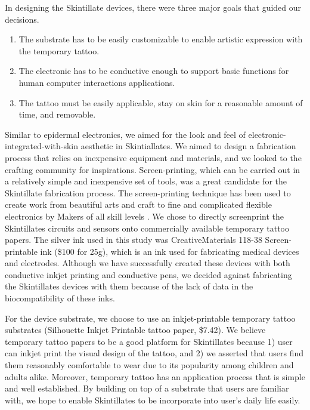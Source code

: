 \documentclass{sigchi}
\begin{document}
 In designing the Skintillate devices, there were three major goals that guided our decisions. 

\begin{enumerate}
  \item The substrate has to be easily customizable to enable artistic expression with the temporary tattoo.
  \item The electronic has to be conductive enough to support basic functions for human computer interactions applications. 
  \item The tattoo must be easily applicable, stay on skin for a reasonable amount of time, and removable.
\end{enumerate}

Similar to epidermal electronics, we aimed for the look and feel of electronic-integrated-with-skin aesthetic in Skintiallates. We aimed to design a fabrication process that relies on inexpensive equipment and materials, and we looked to the crafting community for inspirations. Screen-printing, which can be carried out in a relatively simple and inexpensive set of tools, was a great candidate for the Skintillate fabrication process. The screen-printing technique has been used to create work from beautiful arts and craft to fine and complicated flexible electronics by Makers of all skill levels \cite{Olberding:2014ds}. We chose to directly screenprint the Skintillates circuits and sensors onto commercially available temporary tattoo papers. The silver ink used in this study was CreativeMaterials 118-38 Screen-printable ink (\$100 for 25g), which is an ink used for fabricating medical devices and electrodes. Although we have successfully created these devices with both conductive inkjet printing and conductive pens, we decided against fabricating the Skintillates devices with them because of the lack of data in the biocompatibility of these inks. 

For the device substrate, we choose to use an inkjet-printable temporary tattoo substrates (Silhouette Inkjet Printable tattoo paper, \$7.42). We believe temporary tattoo papers to be a good platform for Skintillates because 1) user can inkjet print the visual design of the tattoo, and 2) we asserted that users find them reasonably comfortable to wear due to its popularity among children and adults alike. Moreover, temporary tattoo has an application process that is simple and well established. By building on top of a substrate that users are familiar with, we hope to enable Skintillates to be incorporate into user's daily life easily.
\end{document}
